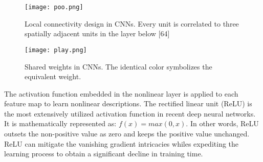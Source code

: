 \documentclass[doctor,english,listoffigures,listoftables]{thesis-uestc}
\begin{document}
\begin{figure}[H]
\texttt{[image: poo.png]}
\caption{Local connectivity design in CNNs. Every unit is correlated to three spatially adjacent units in the layer below [64]}
\label{p1}
\end{figure} 
\begin{figure}[H]
\texttt{[image: play.png]}
\caption{Shared weights in CNNs. The identical color symbolizes the equivalent weight.}
\label{p2}
\end{figure} 
The activation function embedded in the nonlinear layer is applied to each feature map to learn nonlinear descriptions. The rectified linear unit (ReLU) is the most extensively utilized activation function in recent deep neural networks. It is mathematically represented as: $f(x) =max(0,x)$. In other words, ReLU outsets the non-positive value as zero and keeps the positive value unchanged. ReLU can mitigate the vanishing gradient intricacies whiles expediting the learning process to obtain a significant decline in training time. \par
\end{document}
